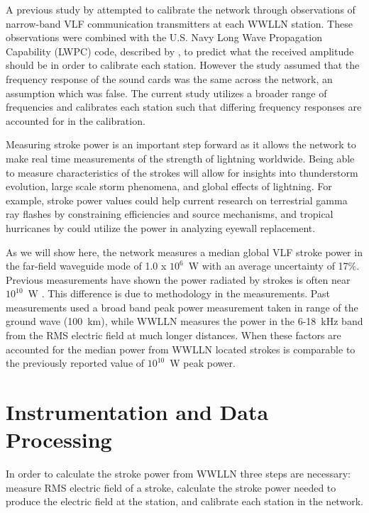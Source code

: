 \documentclass[12pt]{article}
\begin{document}
A previous study by \citet{Rodger2006} attempted to calibrate the network through observations of narrow-band VLF communication transmitters at each WWLLN station. These observations were combined with the U.S. Navy Long Wave Propagation Capability (LWPC) code, described by \citet{Ferguson1998}, to predict what the received amplitude should be in order to calibrate each station. However the study assumed that the frequency response of the sound cards was the same across the network, an assumption which was false. The current study utilizes a broader range of frequencies and calibrates each station such that differing frequency responses are accounted for in the calibration.

Measuring stroke power is an important step forward as it allows the network to make real time measurements of the strength of lightning worldwide. Being able to measure characteristics of the strokes will allow for insights into thunderstorm evolution, large scale storm phenomena, and global effects of lightning. For example, stroke power values could help current research on terrestrial gamma ray flashes by \citet{Briggs2011} constraining efficiencies and source mechanisms, and tropical hurricanes by \citet{Thomas2010d} could utilize the power in analyzing eyewall replacement.

As we will show here, the network measures a median global VLF stroke power in the far-field waveguide mode of 1.0 x $10^6$~W with an average uncertainty of 17\%. Previous measurements have shown the power radiated by strokes is often near $10^{10}$~W \citep{Krider1983}. This difference is due to methodology in the measurements. Past measurements used a broad band peak power measurement taken in range of the ground wave (100~km), while WWLLN measures the power in the 6-18~kHz band from the RMS electric field at much longer distances. When these factors are accounted for the median power from WWLLN located strokes is comparable to the previously reported value of $10^{10}$~W peak power.

\section{Instrumentation and Data Processing}


In order to calculate the stroke power from WWLLN three steps are necessary: measure RMS electric field of a stroke, calculate the stroke power needed to produce the electric field at the station, and calibrate each station in the network.
\end{document}

